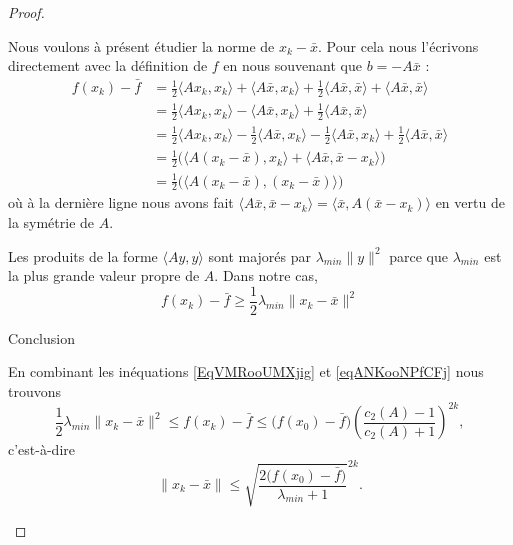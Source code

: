 \begin{proof}
\begin{subproof}
		Nous voulons à présent étudier la norme de \( x_k-\bar x\). Pour cela nous l'écrivons directement avec la définition de \( f\) en nous souvenant que \( b=-A\bar x\) :
		\begin{subequations}
			\begin{align}
				f(x_k)-\bar f & =\frac{ 1 }{2}\langle Ax_k, x_k\rangle +\langle A\bar x, x_k\rangle +\frac{ 1 }{2}\langle A\bar x, \bar x\rangle +\langle A\bar x, \bar x\rangle                       \\
				              & =\frac{ 1 }{2}\langle Ax_k, x_k\rangle -\langle A\bar x, x_k\rangle +\frac{ 1 }{2}\langle A\bar x, \bar x\rangle                                                       \\
				              & =\frac{ 1 }{2}\langle Ax_k, x_k\rangle -\frac{ 1 }{2}\langle A\bar x, x_k\rangle-\frac{ 1 }{2}\langle A\bar x, x_k\rangle +\frac{ 1 }{2}\langle A\bar x, \bar x\rangle \\
				              & =\frac{ 1 }{2}\Big( \langle A(x_k-\bar x), x_k\rangle +\langle A\bar x, \bar x-x_k\rangle  \Big)                                                                       \\
				              & =\frac{ 1 }{2}\Big( \langle A(x_k-\bar x), (x_k-\bar x)\rangle  \Big)
			\end{align}
		\end{subequations}
		où à la dernière ligne nous avons fait \( \langle A\bar x, \bar x-x_k\rangle =\langle \bar x, A(\bar x-x_k)\rangle \) en vertu de la symétrie de \( A\).

		Les produits de la forme \( \langle Ay, y\rangle \) sont majorés par \( \lambda_{min}\| y \|^2\) parce que \( \lambda_{min}\) est la plus grande valeur propre de \( A\). Dans notre cas,
		\begin{equation}    \label{EqVMRooUMXjig}
			f(x_k)-\bar f\geq \frac{ 1 }{2}\lambda_{min}\| x_k-\bar x \|^2
		\end{equation}

		\item[Conclusion]

		En combinant les inéquations \eqref{EqVMRooUMXjig} et \eqref{eqANKooNPfCFj} nous trouvons
		\begin{equation}
			\frac{ 1 }{2}\lambda_{min}\| x_k-\bar x \|^2\leq f(x_k)-\bar f\leq \big( f(x_0)-\bar f \big)\left( \frac{ c_2(A)-1 }{ c_2(A)+1 } \right)^{2k},
		\end{equation}
		c'est-à-dire
		\begin{equation}
			\| x_k-\bar x \|\leq \sqrt{\frac{ 2\big( f(x_0)-\bar f \big) }{ \lambda_{min} +1}}^{2k}.
		\end{equation}
	\end{subproof}
\end{proof}

